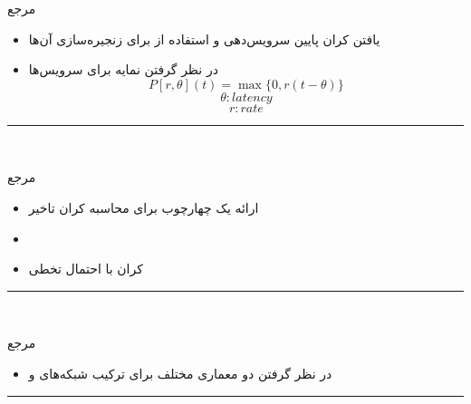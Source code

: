 \documentclass[dvipsnames]{beamer}
\makeatletter
\newcommand{\RTList}{\raggedleft\rightskip\@totalleftmargin}
\makeatother
\begin{document}
\begin{persian}
	\begin{frame}{مرجع~\cite{Duan2018}}
		\begin{itemize}\RTList{}
				\justifying%
				\item یافتن کران پایین سرویس‌دهی و استفاده از  برای زنجیره‌سازی آن‌ها
				\item در نظر گرفتن نمایه  برای سرویس‌ها
				\[ P[r, \theta](t) = \max\{0, r(t - \theta)\} \]
				\[ \theta: latency \]
				\[ r: rate \]
		\end{itemize}
		\begin{latin}
		\noindent\rule{1cm}{0.4pt}\\
		\scriptsize{}
		\end{latin}
	\end{frame}

	\begin{frame}{مرجع~\cite{Miao2019}}
		\begin{itemize}\RTList{}
				\justifying%
				\item ارائه یک چهارچوب برای محاسبه کران تاخیر
				\item {}
				\item کران با احتمال تخطی
		\end{itemize}
		\begin{latin}
		\noindent\rule{1cm}{0.4pt}\\
		\scriptsize{}
		\end{latin}
	\end{frame}

	\begin{frame}{مرجع~\cite{Fahmin2017}}
		\begin{itemize}\RTList{}
				\justifying%
				\item در نظر گرفتن دو معماری مختلف برای ترکیب شبکه‌های  و 
				\begin{itemize}\end{itemize}
		\end{itemize}
		\begin{latin}
		\noindent\rule{1cm}{0.4pt}\\
		\scriptsize{}
		\end{latin}
	\end{frame}


\end{persian}
\end{document}
